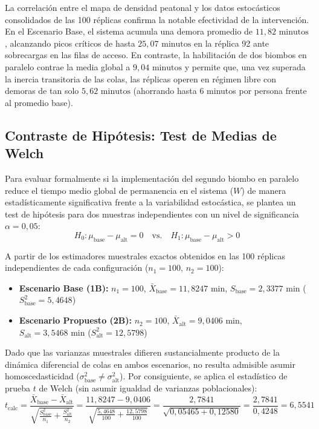 \documentclass[11pt,a4paper]{article}
\begin{document}
La correlación entre el mapa de densidad peatonal y los datos estocásticos consolidados de las 100 réplicas confirma la notable efectividad de la intervención. En el Escenario Base, el sistema acumula una demora promedio de $11{,}82\text{ minutos}$, alcanzando picos críticos de hasta $25{,}07\text{ minutos}$ en la réplica 92 ante sobrecargas en las filas de acceso. En contraste, la habilitación de dos biombos en paralelo contrae la media global a $9{,}04\text{ minutos}$ y permite que, una vez superada la inercia transitoria de las colas, las réplicas operen en régimen libre con demoras de tan solo $5{,}62\text{ minutos}$ (ahorrando hasta 6 minutos por persona frente al promedio base).

\subsection{Contraste de Hipótesis: Test de Medias de Welch}
Para evaluar formalmente si la implementación del segundo biombo en paralelo reduce el tiempo medio global de permanencia en el sistema ($W$) de manera estadísticamente significativa frente a la variabilidad estocástica, se plantea un test de hipótesis para dos muestras independientes con un nivel de significancia $\alpha = 0{,}05$:
\begin{equation}
    H_0: \mu_{\text{base}} - \mu_{\text{alt}} = 0 \quad \text{vs.} \quad H_1: \mu_{\text{base}} - \mu_{\text{alt}} > 0
\end{equation}

A partir de los estimadores muestrales exactos obtenidos en las 100 réplicas independientes de cada configuración ($n_1 = 100, \, n_2 = 100$):
\begin{itemize}
    \item \textbf{Escenario Base (1B):} $n_1 = 100$, $\bar{X}_{\text{base}} = 11{,}8247\text{ min}$, $S_{\text{base}} = 2{,}3377\text{ min}$ ($S_{\text{base}}^2 = 5{,}4648$)
    \item \textbf{Escenario Propuesto (2B):} $n_2 = 100$, $\bar{X}_{\text{alt}} = 9{,}0406\text{ min}$, $S_{\text{alt}} = 3{,}5468\text{ min}$ ($S_{\text{alt}}^2 = 12{,}5798$)
\end{itemize}

Dado que las varianzas muestrales difieren sustancialmente producto de la dinámica diferencial de colas en ambos escenarios, no resulta admisible asumir homoscedasticidad ($\sigma_{\text{base}}^2 \neq \sigma_{\text{alt}}^2$). Por consiguiente, se aplica el estadístico de prueba $t$ de Welch (sin asumir igualdad de varianzas poblacionales):
\begin{equation}
    t_{\text{calc}} = \frac{\bar{X}_{\text{base}} - \bar{X}_{\text{alt}}}{\sqrt{\frac{S_{\text{base}}^2}{n_1} + \frac{S_{\text{alt}}^2}{n_2}}} = \frac{11{,}8247 - 9{,}0406}{\sqrt{\frac{5{,}4648}{100} + \frac{12{,}5798}{100}}} = \frac{2{,}7841}{\sqrt{0{,}05465 + 0{,}12580}} = \frac{2{,}7841}{0{,}4248} = 6{,}5541
\end{equation}
\end{document}

